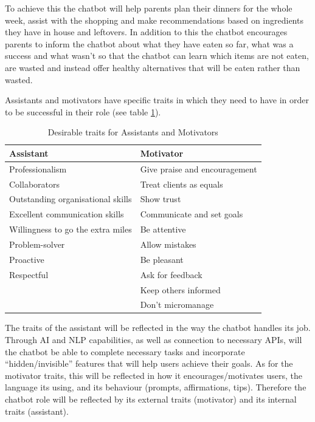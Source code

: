     To achieve this the chatbot will help parents plan their dinners for the whole week, assist with the shopping and make recommendations based on ingredients they have in house and leftovers. In addition to this the chatbot encourages parents to inform the chatbot about what they have eaten so far, what was a success and what wasn’t so that the chatbot can learn which items are not eaten, are wasted and instead offer healthy alternatives that will be eaten rather than wasted. 
    
    Assistants and motivators have specific traits \citep{burge2016,lipcamon_2013} in which they need to have in order to be successful in their role (see table \ref{table:2}).
    
\vspace{2,5mm}

    \begin{table}[h]
    \begin{tabular}{ |p{}||p{}|  }
    \hline
    Assistant & Motivator \\
    \hline
        Professionalism & Give praise and encouragement \\
        Collaborators & Treat clients as equals \\
        Outstanding organisational skills & Show trust \\
        Excellent communication skills & Communicate and set goals \\
        Willingness to go the extra miles & Be attentive \\
        Problem-solver & Allow mistakes \\
        Proactive & Be pleasant \\
        Respectful & Ask for feedback \\
        & Keep others informed \\
        & Don’t micromanage \\
    \hline
    \end{tabular}
    \caption{Desirable traits for Assistants and Motivators}
    \label{table:2}
    \end{table}
 
    The traits of the assistant will be reflected in the way the chatbot handles its job. Through AI and NLP capabilities, as well as connection to necessary APIs, will the chatbot be able to complete necessary tasks and incorporate “hidden/invisible” features that will help users achieve their goals. As for the motivator traits, this will be reflected in how it encourages/motivates users, the language its using, and its behaviour (prompts, affirmations, tips). Therefore the chatbot role will be reflected by its external traits (motivator) and its internal traits (assistant).
    
